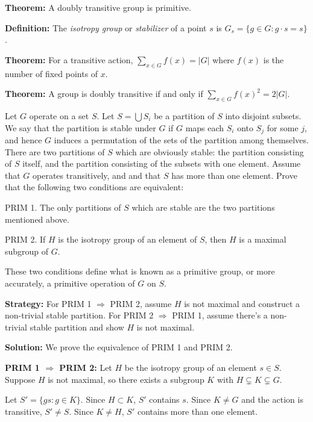 \textbf{Theorem:} A doubly transitive group is primitive.

\textbf{Definition:} The \textit{isotropy group} or \textit{stabilizer} of a point $s$ is $G_s = \{g \in G : g \cdot s = s\}$.

\textbf{Theorem:} For a transitive action, $\sum_{x \in G} f(x) = |G|$ where $f(x)$ is the number of fixed points of $x$.

\textbf{Theorem:} A group is doubly transitive if and only if $\sum_{x \in G} f(x)^2 = 2|G|$.

\begin{problembox}
Let $G$ operate on a set $S$. Let $S = \bigcup S_i$ be a partition of $S$ into disjoint subsets. We say that the partition is stable under $G$ if $G$ maps each $S_i$ onto $S_j$ for some $j$, and hence $G$ induces a permutation of the sets of the partition among themselves. There are two partitions of $S$ which are obviously stable: the partition consisting of $S$ itself, and the partition consisting of the subsets with one element. Assume that $G$ operates transitively, and and that $S$ has more than one element. Prove that the following two conditions are equivalent:

PRIM 1. The only partitions of $S$ which are stable are the two partitions mentioned above.

PRIM 2. If $H$ is the isotropy group of an element of $S$, then $H$ is a maximal subgroup of $G$.

These two conditions define what is known as a primitive group, or more accurately, a primitive operation of $G$ on $S$.
\end{problembox}

\noindent\textbf{Strategy:} For PRIM 1 $\Rightarrow$ PRIM 2, assume $H$ is not maximal and construct a non-trivial stable partition. For PRIM 2 $\Rightarrow$ PRIM 1, assume there's a non-trivial stable partition and show $H$ is not maximal.

\noindent\textbf{Solution:} We prove the equivalence of PRIM 1 and PRIM 2.

\textbf{PRIM 1 $\Rightarrow$ PRIM 2:} Let $H$ be the isotropy group of an element $s \in S$. Suppose $H$ is not maximal, so there exists a subgroup $K$ with $H \subsetneq K \subsetneq G$.

Let $S' = \{gs : g \in K\}$. Since $H \subset K$, $S'$ contains $s$. Since $K \neq G$ and the action is transitive, $S' \neq S$. Since $K \neq H$, $S'$ contains more than one element.

